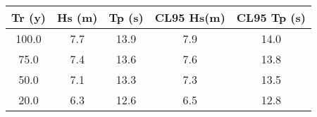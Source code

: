 \begin{tabular}{ccccc}
Tr (y)& Hs (m)& Tp (s)& CL95 Hs(m)& CL95 Tp (s)\\ \hline
100.0 & 7.7 & 13.9 & 7.9 & 14.0 \\
75.0 & 7.4 & 13.6 & 7.6 & 13.8 \\
50.0 & 7.1 & 13.3 & 7.3 & 13.5 \\
20.0 & 6.3 & 12.6 & 6.5 & 12.8 \\
\hline
\end{tabular}
